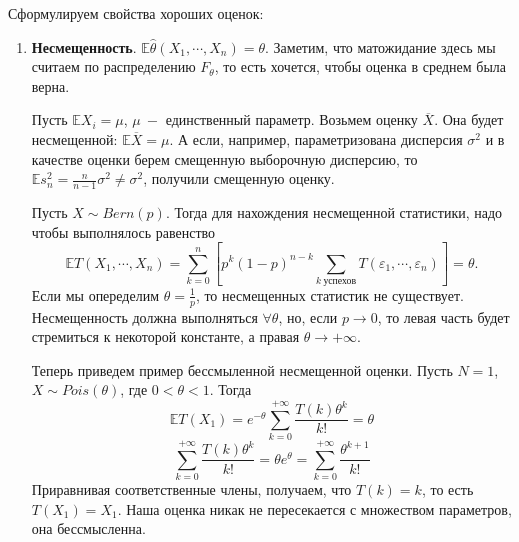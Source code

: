 Сформулируем свойства хороших оценок:
\begin{enumerate}
\item \textbf{Несмещенность}. $\mathbb{E} \widehat{\theta}\left(X_1, \cdots, X_n\right) = \theta$. Заметим, что матожидание здесь мы считаем по распределению $F_{\theta}$, то есть хочется, чтобы оценка в среднем была верна.
\begin{example}
Пусть $\mathbb{E} X_i = \mu$, $\mu \ - $ единственный параметр. Возьмем оценку $\overline{X}$. Она будет несмещенной: $\mathbb{E} \overline{X} = \mu$. А если, например, параметризована дисперсия $\sigma ^ 2$ и в качестве оценки берем смещенную выборочную дисперсию, то $\mathbb{E}s_n ^ 2 = \frac{n}{n - 1} \sigma ^ 2 \neq \sigma^2$, получили смещенную оценку.
\end{example}
\begin{example}
Пусть $X \sim Bern\left(p\right)$. Тогда для нахождения несмещенной статистики, надо чтобы выполнялось равенство
\[
    \mathbb{E} T\left(X_1, \cdots, X_n\right) = \sum_{k = 0}^{n} \left[p ^ k \left(1 - p\right) ^ {n - k} \sum_{k \ \text{успехов}}T\left(\varepsilon_1, \cdots, \varepsilon_n\right)\right] = \theta.
\]
Если мы опеределим $\theta = \frac 1 p$, то несмещенных статистик не существует. Несмещенность должна выполняться $\forall \theta$, но, если $p \to 0$, то левая часть будет стремиться к некоторой константе, а правая $\theta \to +\infty$.
\end{example}
\begin{example}
Теперь приведем пример бессмыленной несмещенной оценки. Пусть $N = 1$, $X \sim Pois\left(\theta\right)$, где $0 < \theta < 1$. Тогда
\[
    \mathbb{E} T\left(X_1\right) = e ^ {-\theta} \sum_{k = 0}^{+\infty}\frac{T\left(k\right) \theta ^ k}{k!} = \theta
\]\[
    \sum_{k = 0}^{+\infty}\frac{T\left(k\right) \theta ^ k}{k!} = \theta e ^ {\theta} = \sum_{k=0}^{+\infty} \frac{\theta ^ {k + 1}}{k!}
\]
Приравнивая соответственные члены, получаем, что $T\left(k\right) = k$, то есть $T\left(X_1\right) = X_1$. Наша оценка никак не пересекается с множеством параметров, она бессмысленна.
\end{example}


\end{enumerate}

